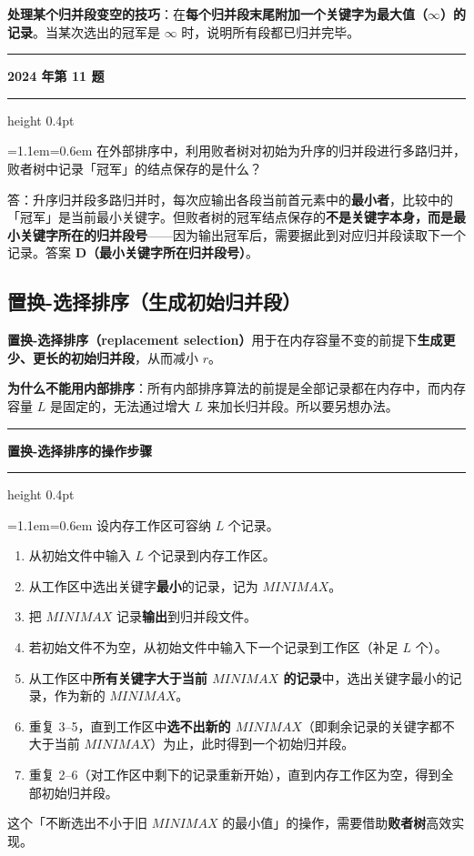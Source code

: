 \documentclass[11pt,openany,UTF8]{ctexbook}
\newcommand{\callouthead}[2]{%
  \par\addvspace{7pt}\noindent
  {\color{#1}\rule[-0.15em]{3pt}{1.05em}}\hspace{0.5em}%
  {\bfseries\color{#1}#2}\par\nobreak\vspace{-0.35em}%
  {\color{rulesep}\hrule height 0.4pt}\nobreak\vspace{0.45em}%
  \begingroup\small\setlength{\parindent}{0pt}%
  \leftskip=1.1em\rightskip=0.6em\noindent\ignorespaces}
\newcommand{\calloutend}{\par\endgroup\addvspace{7pt}}
\newenvironment{callkey}[1]{\callouthead{keybar}{#1}}{\calloutend}
\newenvironment{callexam}[1]{\callouthead{exambar}{#1}}{\calloutend}
\begin{document}
\textbf{处理某个归并段变空的技巧}：在\textbf{每个归并段末尾附加一个关键字为最大值（$\infty$）的记录}。当某次选出的冠军是 $\infty$ 时，说明所有段都已归并完毕。

\begin{callexam}{2024 年第 11 题}
在外部排序中，利用败者树对初始为升序的归并段进行多路归并，败者树中记录「冠军」的结点保存的是什么？

答：升序归并段多路归并时，每次应输出各段当前首元素中的\textbf{最小者}，比较中的「冠军」是当前最小关键字。但败者树的冠军结点保存的\textbf{不是关键字本身，而是最小关键字所在的归并段号}——因为输出冠军后，需要据此到对应归并段读取下一个记录。答案 \textbf{D（最小关键字所在归并段号）}。

\end{callexam}

\subsection{置换-选择排序（生成初始归并段）}

\textbf{置换-选择排序（replacement selection）}用于在内存容量不变的前提下\textbf{生成更少、更长的初始归并段}，从而减小 $r$。

\textbf{为什么不能用内部排序}：所有内部排序算法的前提是全部记录都在内存中，而内存容量 $L$ 是固定的，无法通过增大 $L$ 来加长归并段。所以要另想办法。

\begin{callkey}{置换-选择排序的操作步骤}
设内存工作区可容纳 $L$ 个记录。

\begin{enumerate}
\item 从初始文件中输入 $L$ 个记录到内存工作区。
\item 从工作区中选出关键字\textbf{最小}的记录，记为 $MINIMAX$。
\item 把 $MINIMAX$ 记录\textbf{输出}到归并段文件。
\item 若初始文件不为空，从初始文件中输入下一个记录到工作区（补足 $L$ 个）。
\item 从工作区中\textbf{所有关键字大于当前 $MINIMAX$ 的记录}中，选出关键字最小的记录，作为新的 $MINIMAX$。
\item 重复 3–5，直到工作区中\textbf{选不出新的 $MINIMAX$}（即剩余记录的关键字都不大于当前 $MINIMAX$）为止，此时得到一个初始归并段。
\item 重复 2–6（对工作区中剩下的记录重新开始），直到内存工作区为空，得到全部初始归并段。
\end{enumerate}
这个「不断选出不小于旧 $MINIMAX$ 的最小值」的操作，需要借助\textbf{败者树}高效实现。

\end{callkey}
\end{document}

